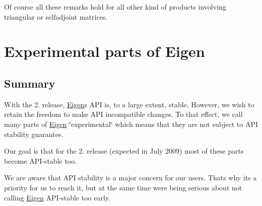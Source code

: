 Of course all these remarks hold for all other kind of products involving triangular or selfadjoint matrices. \hypertarget{Experimental}{}\section{Experimental parts of Eigen}\label{Experimental}
\hypertarget{_experimental_Experimental_summary}{}\subsection{Summary}\label{_experimental_Experimental_summary}
With the 2. release, \hyperlink{namespace_eigen}{Eigen}\textquotesingle{}s A\+PI is, to a large extent, stable. However, we wish to retain the freedom to make A\+PI incompatible changes. To that effect, we call many parts of \hyperlink{namespace_eigen}{Eigen} \char`\"{}experimental\char`\"{} which means that they are not subject to A\+PI stability guarantee.

Our goal is that for the 2. release (expected in July 2009) most of these parts become A\+P\+I-\/stable too.

We are aware that A\+PI stability is a major concern for our users. That\textquotesingle{}s why it\textquotesingle{}s a priority for us to reach it, but at the same time we\textquotesingle{}re being serious about not calling \hyperlink{namespace_eigen}{Eigen} A\+P\+I-\/stable too early.

